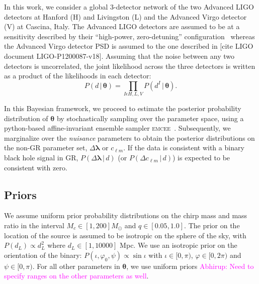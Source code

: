\documentclass[prd,preprintnumbers,twocolumn,eqsecnum,floatfix,a4paper,nofootinbib,superscriptaddress]{revtex4}
\newcommand{\abhirup}[1]{\textcolor{magenta}{Abhirup: #1}}
\newcommand{\blambda}{\bm{\lambda}}
\newcommand{\btheta}{\bm{\theta}}
\begin{document}
In this work, we consider a global 3-detector network of the two Advanced LIGO detectors at Hanford (H) and Livingston (L) and the Advanced Virgo detector (V) at Cascina, Italy. The Advanced LIGO detectors are assumed to be at a sensitivity described by their ``high-power, zero-detuning'' configuration~\cite{aLIGOZeroDetHighPower} whereas the Advanced Virgo detector PSD is assumed to the one described in [cite LIGO document LIGO-P1200087-v18]. Assuming that the noise between any two detectors is uncorrelated, the joint likelihood across the three detectors is written as a product of the likelihoods in each detector:
\begin{equation}
P (d \, | \, {\btheta}) = \prod_{I \epsilon {H,L,V}} P (d^{I} \, | \, {\btheta}).
\end{equation}

In this Bayesian framework, we proceed to estimate the posterior probability distribution of $\btheta$ by stochastically sampling over the parameter space, using a python-based affine-invariant ensemble sampler \textsc{emcee}~\cite{foreman2013emcee, goodman2010ensemble}. Subsequently, we marginalize over the \textit{nuisance} parameters to obtain the posterior distributions on the non-GR parameter set, ${\Delta \blambda}$ or $c_{\ell m}$. If the data is consistent with a binary black hole signal in GR, $P(\Delta \blambda \, | \, d)$ (or $P(\Delta c_{\ell m} \, | \, d)$) is expected to be consistent with zero. 

\subsection{Priors}
\label{sec:priors}

We assume uniform prior probability distributions on the chirp mass and mass ratio in the interval $M_c \in [1,200] M_\odot$ and $q \in [0.05,1.0]$. The prior on the location of the source is  assumed to be isotropic on the sphere of  the  sky,  with $P({d_L}) \propto d_{L}^{2}$ where $d_L \in [1,10000]$ Mpc. We use an  isotropic  prior  on  the  orientation  of  the  binary: $P({\iota,\varphi_0,\psi}) \propto \sin\iota$ with $\iota \in [0,\pi)$, $\varphi \in [0,2\pi)$ and $\psi \in [0,\pi)$. For all other parameters in $\btheta$, we use uniform priors \abhirup{Need to specify ranges on the other parameters as well}.
\end{document}
